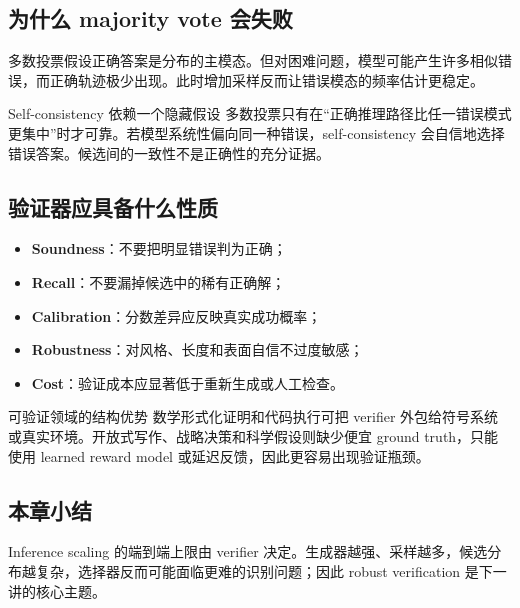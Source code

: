 \documentclass[a4paper]{article}
\begin{document}
\subsection{为什么 majority vote 会失败}

多数投票假设正确答案是分布的主模态。但对困难问题，模型可能产生许多相似错误，而正确轨迹极少出现。此时增加采样反而让错误模态的频率估计更稳定。


\begin{warningbox}{Self-consistency 依赖一个隐藏假设}
多数投票只有在“正确推理路径比任一错误模式更集中”时才可靠。若模型系统性偏向同一种错误，self-consistency 会自信地选择错误答案。候选间的一致性不是正确性的充分证据。
\end{warningbox}

\subsection{验证器应具备什么性质}

\begin{itemize}
    \item \textbf{Soundness}：不要把明显错误判为正确；
    \item \textbf{Recall}：不要漏掉候选中的稀有正确解；
    \item \textbf{Calibration}：分数差异应反映真实成功概率；
    \item \textbf{Robustness}：对风格、长度和表面自信不过度敏感；
    \item \textbf{Cost}：验证成本应显著低于重新生成或人工检查。
\end{itemize}

\begin{knowledgebox}{可验证领域的结构优势}
数学形式化证明和代码执行可把 verifier 外包给符号系统或真实环境。开放式写作、战略决策和科学假设则缺少便宜 ground truth，只能使用 learned reward model 或延迟反馈，因此更容易出现验证瓶颈。
\end{knowledgebox}

\subsection{本章小结}

Inference scaling 的端到端上限由 verifier 决定。生成器越强、采样越多，候选分布越复杂，选择器反而可能面临更难的识别问题；因此 robust verification 是下一讲的核心主题。
\end{document}
